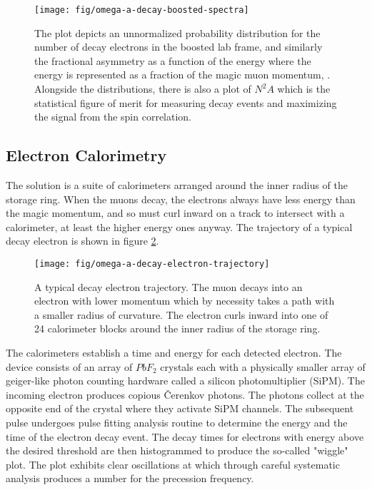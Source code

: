 \begin{figure}
\label{fig:omega-a-decay-boosted-spectra}
\texttt{[image: fig/omega-a-decay-boosted-spectra]}
\caption{The plot depicts an unnormalized probability distribution for the number of decay electrons in the boosted lab frame, and similarly the fractional asymmetry as a function of the energy where the energy is represented as a fraction of the magic muon momentum, \pmagic. Alongside the distributions, there is also a plot of $N^2A$ which is the statistical figure of merit for measuring decay events and maximizing the signal from the spin correlation.}
\end{figure}

\subsection{Electron Calorimetry}

The solution is a suite of calorimeters arranged around the inner radius of the storage ring.  When the muons decay, the electrons always have less energy than the magic momentum, and so must curl inward on a track to intersect with a calorimeter, at least the higher energy ones anyway. The trajectory of a typical decay electron is shown in figure \ref{fig:omega-a-decay-electron-trajectory}.

\begin{figure}
\label{fig:omega-a-decay-electron-trajectory}
\texttt{[image: fig/omega-a-decay-electron-trajectory]}
\caption{A typical decay electron trajectory.  The muon decays into an electron with lower momentum which by necessity takes a path with a smaller radius of curvature.  The electron curls inward into one of 24 calorimeter blocks around the inner radius of the storage ring.}
\end{figure}

The calorimeters establish a time and energy for each detected electron.  The device consists of an array of $PbF_2$ crystals each with a physically smaller array of geiger-like photon counting hardware called a silicon photomultiplier (SiPM).  The incoming electron produces copious \v{C}erenkov photons.  The photons collect at the opposite end of the crystal where they activate SiPM channels.  The subsequent pulse undergoes pulse fitting analysis routine to determine the energy and the time of the electron decay event.  The decay times for electrons with energy above the desired threshold are then histogrammed to produce the so-called "wiggle" plot.  The plot exhibits clear oscillations at \wa which through careful systematic analysis produces a number for the precession frequency.

